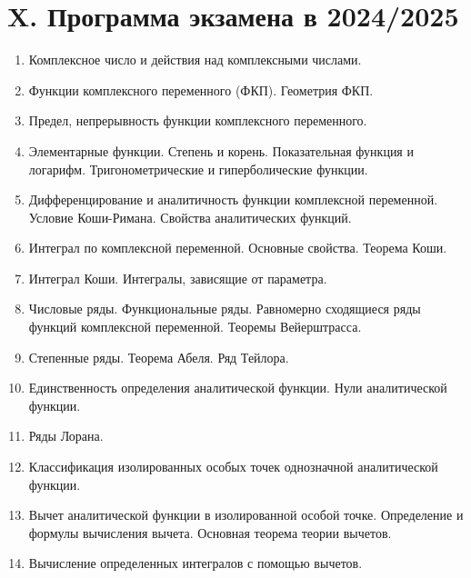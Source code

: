\documentclass[12pt]{article}
\begin{document}

\clearpage

\section{X. Программа экзамена в 2024/2025}

\begin{enumerate}
    \item Комплексное число и действия над комплексными числами.
    \item Функции комплексного переменного (ФКП). Геометрия ФКП.
    \item Предел, непрерывность функции комплексного переменного.
    \item Элементарные функции. Степень и корень. Показательная функция и логарифм. Тригонометрические и гиперболические функции.
    \item Дифференцирование и аналитичность функции комплексной переменной. Условие Коши-Римана. Свойства аналитических функций.
    \item Интеграл по комплексной переменной. Основные свойства. Теорема Коши.
    \item Интеграл Коши. Интегралы, зависящие от параметра.
    \item Числовые ряды. Функциональные ряды. Равномерно сходящиеся ряды функций комплексной переменной. Теоремы Вейерштрасса.
    \item Степенные ряды. Теорема Абеля. Ряд Тейлора.
    \item Единственность определения аналитической функции. Нули аналитической функции.
    \item Ряды Лорана.
    \item Классификация изолированных особых точек однозначной аналитической функции.
    \item Вычет аналитической функции в изолированной особой точке. Определение и формулы вычисления вычета. Основная теорема теории вычетов.
    \item Вычисление определенных интегралов с помощью вычетов.
\end{enumerate}
\end{document}
